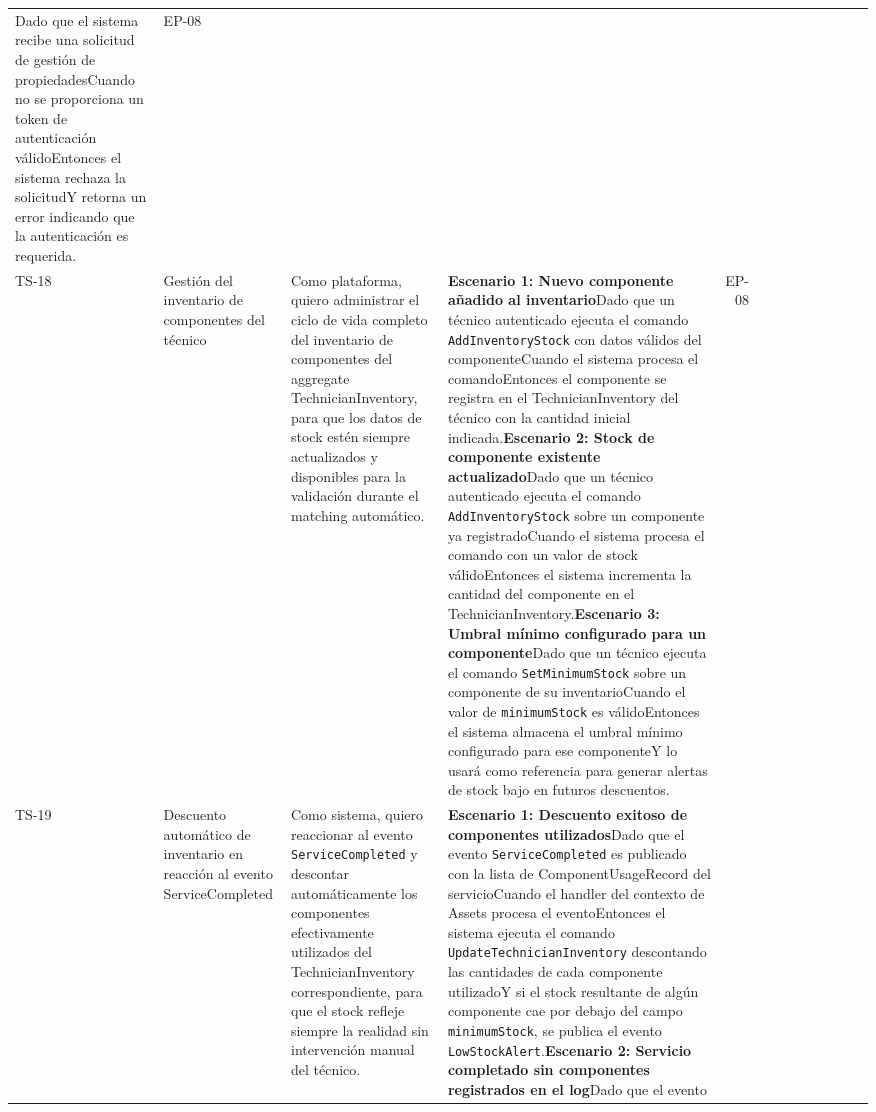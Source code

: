 {\begin{longtable}[]
{autenticación}Dado que el sistema recibe una solicitud de gestión de
propiedadesCuando no se proporciona un token de autenticación
válidoEntonces el sistema rechaza la solicitudY retorna un error
indicando que la autenticación es requerida. & EP-08 \\
TS-18 & Gestión del inventario de componentes del técnico & Como
plataforma, quiero administrar el ciclo de vida completo del inventario
de componentes del aggregate TechnicianInventory, para que los datos de
stock estén siempre actualizados y disponibles para la validación
durante el matching automático. & \textbf{Escenario 1: Nuevo componente
añadido al inventario}Dado que un técnico autenticado ejecuta el comando
\texttt{AddInventoryStock} con datos válidos del componenteCuando el
sistema procesa el comandoEntonces el componente se registra en el
TechnicianInventory del técnico con la cantidad inicial
indicada.\textbf{Escenario 2: Stock de componente existente
actualizado}Dado que un técnico autenticado ejecuta el comando
\texttt{AddInventoryStock} sobre un componente ya registradoCuando el
sistema procesa el comando con un valor de stock válidoEntonces el
sistema incrementa la cantidad del componente en el
TechnicianInventory.\textbf{Escenario 3: Umbral mínimo configurado para
un componente}Dado que un técnico ejecuta el comando
\texttt{SetMinimumStock} sobre un componente de su inventarioCuando el
valor de \texttt{minimumStock} es válidoEntonces el sistema almacena el
umbral mínimo configurado para ese componenteY lo usará como referencia
para generar alertas de stock bajo en futuros descuentos. & EP-08 \\
TS-19 & Descuento automático de inventario en reacción al evento
ServiceCompleted & Como sistema, quiero reaccionar al evento
\texttt{ServiceCompleted} y descontar automáticamente los componentes
efectivamente utilizados del TechnicianInventory correspondiente, para
que el stock refleje siempre la realidad sin intervención manual del
técnico. & \textbf{Escenario 1: Descuento exitoso de componentes
utilizados}Dado que el evento \texttt{ServiceCompleted} es publicado con
la lista de ComponentUsageRecord del servicioCuando el handler del
contexto de Assets procesa el eventoEntonces el sistema ejecuta el
comando \texttt{UpdateTechnicianInventory} descontando las cantidades de
cada componente utilizadoY si el stock resultante de algún componente
cae por debajo del campo \texttt{minimumStock}, se publica el evento
\texttt{LowStockAlert}.\textbf{Escenario 2: Servicio completado sin
componentes registrados en el log}Dado que el evento

\end{longtable}}
